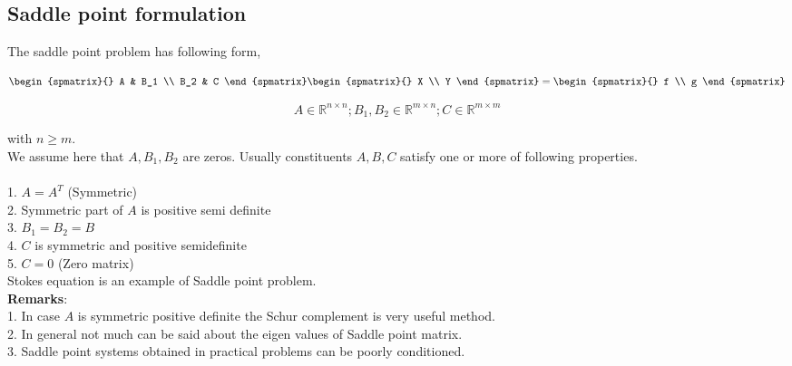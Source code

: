 \documentclass[a4paper,12pt]{book}
\begin{document}
\subsection{Saddle point formulation} \label{saddle_point} \cite{saddle}

The saddle point problem has following form,

\begin{equation} 
\begin{spmatrix}{}
    A & B_1 \\
    B_2 & C
\end{spmatrix}
\begin{spmatrix}{}
    X \\
    Y
\end{spmatrix}
=
\begin{spmatrix}{}
    f  \\
   	g
\end{spmatrix}
\end{equation}

\begin{equation}
A \in \mathbb{R}^{n \times n}; B_1, B_2 \in \mathbb{R}^{m \times n}; C \in \mathbb{R}^{m \times m} 
\end{equation}

with $n \geq m$.\\

We assume here that $A, B_1, B_2$ are zeros. Usually constituents $A,B,C$ satisfy one or more of following properties.
\\
\\
1. $A = A^T$ (Symmetric)\\
2. Symmetric part of $A$ is positive semi definite\\
3. $B_1 = B_2 = B$\\
4. $C$ is symmetric and positive semidefinite\\
5. $C = 0$ (Zero matrix)\\

Stokes equation is an example of Saddle point problem. \\

\textbf{Remarks}:\\

1. In case $A$ is symmetric positive definite the Schur complement is very useful method.\\

2. In general not much can be said about the eigen values of Saddle point matrix.\\ 

3. Saddle point systems obtained in practical problems can be poorly conditioned.\\
\end{document}
